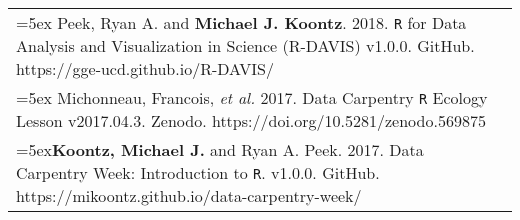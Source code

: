 \documentclass[10pt,english]{article}
\providecommand{\tabularnewline}{\\}
\begin{document}
\renewcommand{\arraystretch}{1.2}
\begin{tabularx}{\textwidth}{@{}>{\raggedright}p{5.25in} >{\raggedleft}X@{}}
\hangindent=5ex Peek, Ryan A. and \textbf{Michael J. Koontz}. 2018. \texttt{R} for Data Analysis and Visualization in Science (R-DAVIS) v1.0.0. GitHub. https://gge-ucd.github.io/R-DAVIS/ & 2018 \tabularnewline

\hangindent=5ex Michonneau, Francois, \emph{et al.} 2017. Data Carpentry \texttt{R} Ecology Lesson v2017.04.3. Zenodo. https://doi.org/10.5281/zenodo.569875 & 2017 \tabularnewline

\hangindent=5ex\textbf{Koontz, Michael J.} and Ryan A. Peek. 2017. Data Carpentry Week: Introduction to \texttt{R}. v1.0.0. GitHub. https://mikoontz.github.io/data-carpentry-week/ & 2017 \tabularnewline

\end{tabularx}

\vspace{1ex}

\end{document}
